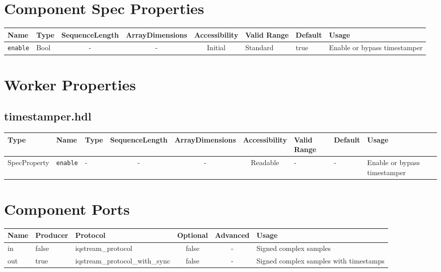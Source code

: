 \documentclass{article}
\def\comp{timestamper}
\begin{document}
\begin{landscape}
	\section*{Component Spec Properties}
	\begin{scriptsize}
		\begin{tabular}{|p{3cm}|p{1.5cm}|c|c|c|p{1.5cm}|p{1cm}|p{7cm}|}
			\hline
			\rowcolor{blue}
			Name          & Type & SequenceLength & ArrayDimensions & Accessibility      & Valid Range & Default & Usage                        \\
			\hline
			\verb+enable+ & Bool & -              & -               & Initial 		   & Standard    & true    & Enable or bypass timestamper \\
			\hline
		\end{tabular}
	\end{scriptsize}

	\section*{Worker Properties}
	\subsection*{\comp.hdl}
	\begin{scriptsize}
		\begin{tabular}{|p{2cm}|p{2cm}|p{1cm}|c|c|c|p{2cm}|p{1cm}|p{4cm}|}
			\hline
			\rowcolor{blue}
			Type     & Name                   & Type   & SequenceLength & ArrayDimensions & Accessibility       & Valid Range & Default & Usage                   \\
			\hline
			SpecProperty & \verb+enable+ 	   & - 		& -              & -               & Readable			   & -           & -		& Enable or bypass timestamper \\
			\hline
		\end{tabular}
	\end{scriptsize}

	\section*{Component Ports}
	\begin{scriptsize}
		\begin{tabular}{|M{2cm}|M{1.5cm}|M{4cm}|c|c|M{9cm}|}
			\hline
			\rowcolor{blue}
			Name & Producer & Protocol                       & Optional & Advanced & Usage                                  \\
			\hline
			in   & false    & iqstream\_protocol             & false    & -        & Signed complex samples                 \\
			\hline
			out  & true     & iqstream\_protocol\_with\_sync & false    & -        & Signed complex samples with timestamps \\
			\hline
		\end{tabular}
	\end{scriptsize}

\end{landscape}
\end{document}
